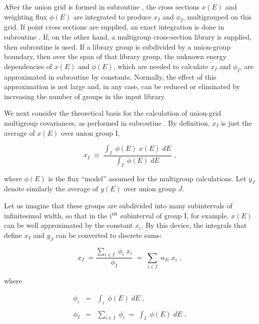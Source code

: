 After the union grid is formed in subroutine
, the cross
sections $x(E)$ and weighting flux $\phi (E)$ are integrated to produce
$x_I$ and $\phi_I$, multigrouped on this grid.  If point cross sections
are supplied, an exact integration is done in subroutine
.  If, on the other hand, a
multigroup cross-section library is supplied, then subroutine
 is used.  If a library group
is subdivided by a union-group boundary, then over the span of that
library group, the unknown energy dependencies of $x(E)$ and $\phi
(E)$, which are needed to calculate $x_I$ and $\phi_I $, are
approximated in subroutine  by constants.  Normally, the
effect of this approximation is not large and, in any case, can be
reduced or eliminated by increasing the number of groups in the input
library.

We next consider the theoretical basis for the calculation of
union-grid multigroup covariances, as performed in subroutine
.  By definition, $x_I$
is just the average of $x(E)$ over union group I,

\begin{equation}
   x_I \; \equiv \;\frac  {\displaystyle\int_I \; \phi (E) \; x(E) \;
  dE}{\displaystyle\int_I \; \phi (E) \; dE} \,\,,
\label{e19}
\end{equation}

\noindent
where $\phi (E)$ is the flux ``model'' assumed for the multigroup
calculations.  Let $y_J$ denote similarly the average of $y(E)$ over
union group $J$.

Let us imagine that these groups are subdivided into many subintervals
of infinitesimal width, so that in the i$^{\rm{th}}$ subinterval of group I,
for example, $x(E)$ can be well approximated by the constant $x_i$.  By
this device, the integrals that define $x_I$ and $y_J$ can be converted
to discrete sums:

\begin{equation}
x_I \; = \frac{{\displaystyle \sum_{i\in I}} \; \phi_i \; x_i}{\phi_I } \; = \;
\sum_{i\in I} \; \alpha_{Ii} \; x_i\,\,,
\label{e20}
\end{equation}

\noindent
where

\begin{eqnarray}
\phi_i & = & \int_{i} \; \phi (E) \; dE \;,\\
\nonumber \\
\phi_I & = & \sum_{i\in I} \; \phi_{i} \; = \; \int_{I} \; \phi (E) \; dE\;,
\end{eqnarray}

